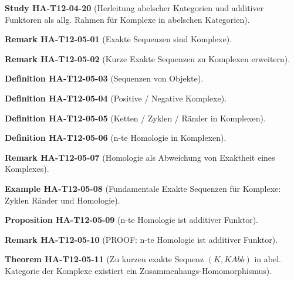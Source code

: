 \documentclass[10pt, letterpaper]{article}
\newcommand{\CustomHeading}[3]{%
  \par\medskip\noindent%
  \textbf{#1 #2} \textnormal{(#3)}.\enskip%
}
\newenvironment{DEF}[2]{\CustomHeading{Definition}{#1}{#2}}{}
\newenvironment{PROP}[2]{\CustomHeading{Proposition}{#1}{#2}}{}
\newenvironment{THEO}[2]{\CustomHeading{Theorem}{#1}{#2}}{}
\newenvironment{REM}[2]{\CustomHeading{Remark}{#1}{#2}}{}
\newenvironment{EXA}[2]{\CustomHeading{Example}{#1}{#2}}{}
\newenvironment{STUD}[2]{\CustomHeading{Study}{#1}{#2}}{}
\begin{document}
\begin{STUD}{HA-T12-04-20}{Herleitung abelscher Kategorien und additiver Funktoren als allg. Rahmen für Komplexe in abelschen Kategorien}
\end{STUD}

\begin{REM}{HA-T12-05-01}{Exakte Sequenzen sind Komplexe}
\end{REM}

\begin{REM}{HA-T12-05-02}{Kurze Exakte Sequenzen zu Komplexen erweitern}
\end{REM}

\begin{DEF}{HA-T12-05-03}{Sequenzen von Objekte}
\end{DEF}

\begin{DEF}{HA-T12-05-04}{Positive / Negative Komplexe}
\end{DEF}

\begin{DEF}{HA-T12-05-05}{Ketten / Zyklen / Ränder in Komplexen}
\end{DEF}

\begin{DEF}{HA-T12-05-06}{n-te Homologie in Komplexen}
\end{DEF}

\begin{REM}{HA-T12-05-07}{Homologie als Abweichung von Exaktheit eines Komplexes}
\end{REM}

\begin{EXA}{HA-T12-05-08}{Fundamentale Exakte Sequenzen für Komplexe: Zyklen Ränder und Homologie}
\end{EXA}

\begin{PROP}{HA-T12-05-09}{n-te Homologie ist additiver Funktor}
\end{PROP}

\begin{REM}{HA-T12-05-10}{PROOF: n-te Homologie ist additiver Funktor}
\end{REM}

\begin{THEO}{HA-T12-05-11}{Zu kurzen exakte Sequenz $(K,KAbb)$ in abel. Kategorie der Komplexe existiert ein Zusammenhangs-Homomorphismus}
\end{THEO}
\end{document}
